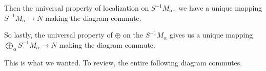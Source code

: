 Then the universal property of localization on $S^{-1}M_\alpha,$ we have a unique mapping $S^{-1}M_\alpha\to N$ making the diagram commute.
\begin{center}
\end{center}
So lastly, the universal property of $\oplus$ on the $S^{-1}M_\alpha$ gives us a unique mapping $\bigoplus_\alpha S^{-1}M_\alpha\to N$ making the diagram commute.
\begin{center}
\end{center}
This is what we wanted. To review, the entire following diagram commutes.
\begin{center}
\end{center}

